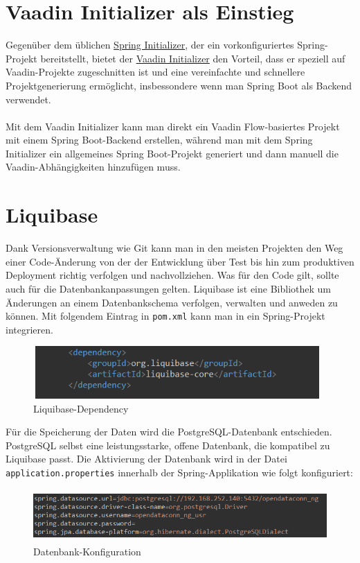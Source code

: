 \documentclass[a4paper,12pt]{scrreprt}
\begin{document}
\section{Vaadin Initializer als Einstieg}
Gegenüber dem üblichen \href{https://start.spring.io/} {Spring Initializer}, der ein vorkonfiguriertes Spring-Projekt bereitstellt, bietet der \href{https://start.vaadin.com/app/p} {Vaadin Initializer} den Vorteil, dass er speziell auf Vaadin-Projekte zugeschnitten ist und eine vereinfachte und schnellere Projektgenerierung ermöglicht, insbessondere wenn man Spring Boot als Backend verwendet.\\ \\ Mit dem Vaadin Initializer kann man direkt ein Vaadin Flow-basiertes Projekt mit einem Spring Boot-Backend erstellen, während man mit dem Spring Initializer ein allgemeines Spring Boot-Projekt generiert und dann manuell die Vaadin-Abhängigkeiten hinzufügen muss.

\section{Liquibase}
Dank Versionsverwaltung wie Git kann man in den meisten Projekten den Weg einer Code-Änderung von der der Entwicklung über Test bis hin zum produktiven Deployment richtig verfolgen und nachvollziehen. Was für den Code gilt, sollte auch für die Datenbankanpassungen gelten. Liquibase ist eine Bibliothek um Änderungen an einem Datenbankschema verfolgen, verwalten und anweden zu können. Mit folgendem Eintrag in \texttt{pom.xml} kann man in ein Spring-Projekt integrieren.
\begin{figure}[h!]
\centering
\includegraphics[width=11cm, height=2cm]{liquibase.png}
\caption{\label{liquibase:dependency} Liquibase-Dependency}
\end{figure}

Für die Speicherung der Daten wird die PostgreSQL-Datenbank entschieden. PostgreSQL selbst eine leistungsstarke, offene Datenbank, die kompatibel zu Liquibase passt. Die Aktivierung der Datenbank wird in der Datei \texttt{application.properties} innerhalb der Spring-Applikation wie folgt konfiguriert:

\begin{figure}[h!]
\centering
\includegraphics[width=13cm, height=2cm]{postgresql.png}
\caption{\label{datenbank:konfiguration} Datenbank-Konfiguration}
\end{figure}
\end{document}

